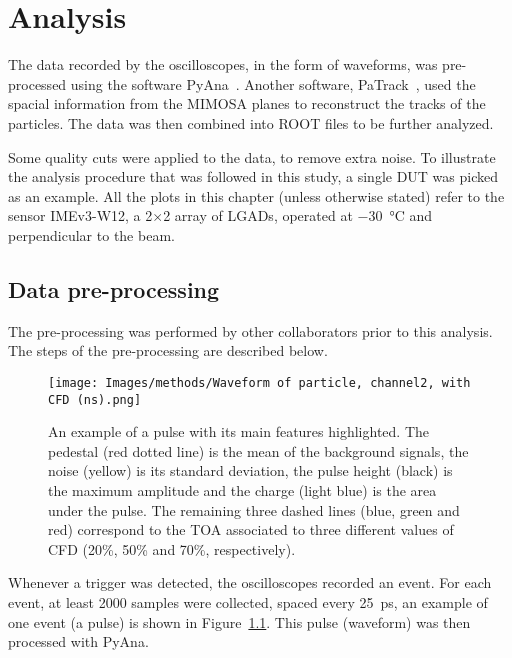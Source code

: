 \chapter{Analysis}\label{chap:analysis}

The data recorded by the oscilloscopes, in the form of waveforms, was pre-processed using the software PyAna~\cite{atlas_hgtd_pyana_2025}. Another software, PaTrack~\cite{atlas_hgtd_patrack_2025}, used the spacial information from the MIMOSA planes to reconstruct the tracks of the particles. The data was then combined into ROOT files to be further analyzed.

Some quality cuts were applied to the data, to remove extra noise. To illustrate the analysis procedure that was followed in this study, a single DUT was picked as an example. All the plots in this chapter (unless otherwise stated) refer to the sensor IMEv3-W12, a 2\(\times\)2 array of LGADs, operated at \qty{-30}{\degreeCelsius} and perpendicular to the beam.

\section{Data pre-processing}

The pre-processing was performed by other collaborators prior to this analysis. The steps of the pre-processing are described below.

\begin{figure}[h!btp]
    \centering
    \texttt{[image: Images/methods/Waveform of particle, channel2, with CFD (ns).png]}
    \captionsetup{width=\captionwidth}
    \caption{An example of a pulse with its main features highlighted. The pedestal (red dotted line) is the mean of the background signals, the noise (yellow) is its standard deviation, the pulse height (black) is the maximum amplitude and the charge (light blue) is the area under the pulse. The remaining three dashed lines (blue, green and red) correspond to the TOA associated to three different values of CFD (20\%, 50\% and 70\%, respectively).}
    \label{fig:waveform_features}
\end{figure} 

Whenever a trigger was detected, the oscilloscopes recorded an event. For each event, at least 2000 samples were collected, spaced every \qty{25}{\pico\second}, an example of one event (a pulse) is shown in Figure~\ref{fig:waveform_features}. This pulse (waveform) was then processed with PyAna.


